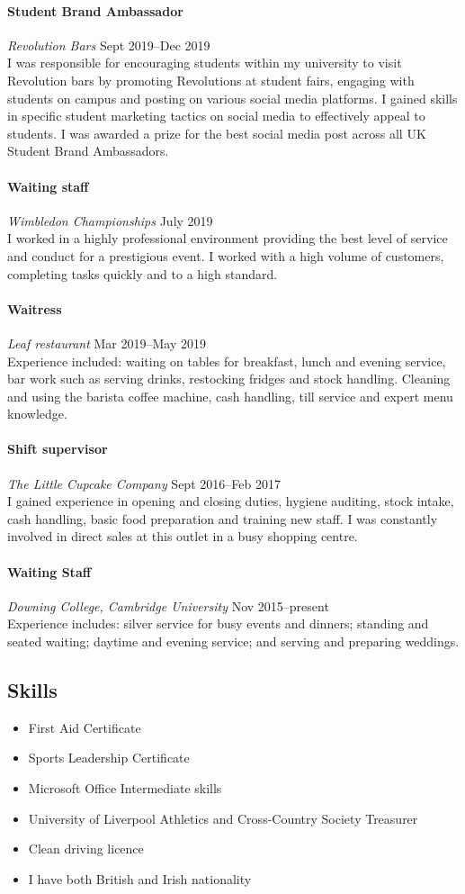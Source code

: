 \documentclass[11pt,a4paper]{article}
\newcommand{\centry}[3]{\paragraph{#1} \textit{#2}%
\hfill#3\\[2pt]}
\begin{document}
\centry{Student Brand Ambassador}{Revolution Bars}{Sept 2019--Dec 2019}

I was responsible for encouraging students within my university to visit
Revolution bars by promoting Revolutions at student fairs, engaging with
students on campus and posting on various social media platforms.  I gained
skills in specific student marketing tactics on social media to effectively
appeal to students. I was awarded a prize for the best social media post across
all UK Student Brand Ambassadors.

\centry{Waiting staff}{Wimbledon Championships}{July 2019}

I worked in a highly professional environment providing the best level of
service and conduct for a prestigious event. I worked with a high volume of
customers, completing tasks quickly and to a high standard.

\centry{Waitress}{Leaf restaurant}{Mar 2019--May 2019}

Experience included: waiting on tables for breakfast, lunch and evening
service, bar work such as serving drinks, restocking fridges and stock
handling. Cleaning and using the barista coffee machine, cash handling, till
service and expert menu knowledge.

\centry{Shift supervisor}{The Little Cupcake Company}{Sept 2016--Feb 2017}

I gained experience in opening and closing duties, hygiene auditing, stock
intake, cash handling, basic food preparation and training new staff. I was
constantly involved in direct sales at this outlet in a busy shopping centre.

\centry{Waiting Staff}{Downing College, Cambridge University}{Nov
  2015--present}

Experience includes: silver service for busy events and dinners; standing and
seated waiting; daytime and evening service; and serving and preparing
weddings.


\subsection*{Skills}
\begin{itemize}[noitemsep]
  \item First Aid Certificate
  \item Sports Leadership Certificate 
  \item Microsoft Office Intermediate skills
  \item University of Liverpool Athletics and Cross-Country Society Treasurer
  \item Clean driving licence 
  \item I have both British and Irish nationality 
\end{itemize}
\end{document}
